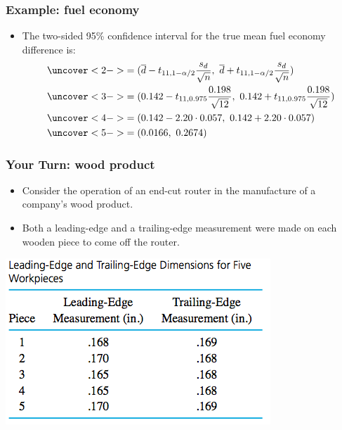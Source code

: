 \documentclass[handout]{beamer}\usepackage[]{graphicx}\usepackage[]{color}
\providecommand{\ov}[1]{\overline{#1}}
\numberwithin{equation}{section}
\begin{document}
\begin{frame}
\frametitle{Example: fuel economy}
\begin{itemize}
\item The two-sided 95\% confidence interval for the true mean fuel economy difference is:
\begin{align*}
&\uncover<2->{= (\ov{d} - t_{11, 1 - \alpha/2} \frac{s_d}{\sqrt{n}}, \ \ov{d} + t_{11, 1 - \alpha/2} \frac{s_d}{\sqrt{n}})} \\
&\uncover<3->{= (0.142 - t_{11, 0.975} \frac{0.198}{\sqrt{12}}, \ 0.142 + t_{11, 0.975} \frac{0.198}{\sqrt{12}})} \\
&\uncover<4->{= (0.142 - 2.20 \cdot  0.057, \ 0.142 + 2.20 \cdot 0.057)} \\
&\uncover<5->{=(0.0166, \ 0.2674)}
\end{align*}
\end{itemize}
\end{frame}










\begin{frame}
\frametitle{Your Turn: wood product} \scriptsize
\begin{itemize}
\item Consider the operation of an end-cut router in the manufacture of a company's wood product. 
\pause \item Both a leading-edge and a trailing-edge measurement were made on each wooden piece to come off the router. 
\end{itemize}
\begin{center}
 \includegraphics{../../fig/wooddata.png}
\end{center}
\begin{itemize}
\end{itemize}
\end{frame}
\end{document}
